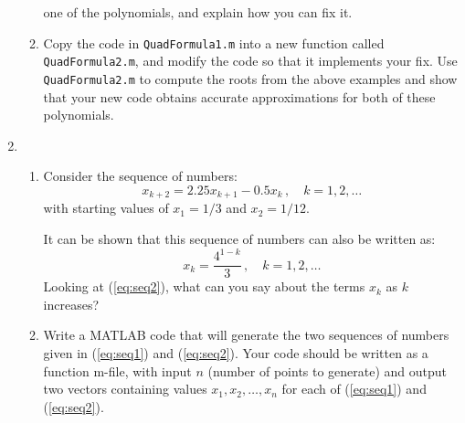 \documentclass[12pt]{article}
\begin{document}
\begin{enumerate}
\begin{enumerate}
one of the polynomials, and explain how you can fix it.
\item
Copy the code in {\tt QuadFormula1.m} into 
a new function called {\tt QuadFormula2.m}, and modify the code so that it
implements your fix.  Use  {\tt QuadFormula2.m} to compute the roots from the above examples 
and show that your new code
obtains accurate approximations for both of these polynomials.
\end{enumerate}
\item
\begin{enumerate}
\item
Consider the sequence of numbers:
\begin{equation}
\label{eq:seq1}
   x_{k+2} = 2.25x_{k+1} - 0.5x_{k}\,, \quad k = 1, 2, \ldots
\end{equation}
with starting values of $x_1 = 1/3$ and $x_2 = 1/12$.

It can be shown that this sequence of numbers can also be written as:
\begin{equation}
\label{eq:seq2}
  x_k = \frac{4^{1-k}}{3}\,, \quad k = 1, 2, \ldots
\end{equation}
Looking at (\ref{eq:seq2}), what can you say about the terms $x_k$
as $k$ increases?
\item
Write a MATLAB code that will generate the two sequences of
numbers given in (\ref{eq:seq1}) and (\ref{eq:seq2}).
Your code should be written as a function m-file, with input
$n$ (number of points to generate) and output two vectors 
containing values $x_1, x_2, \ldots, x_n$ for each of (\ref{eq:seq1}) and (\ref{eq:seq2}).


\end{enumerate}
\end{enumerate}
\end{document}
